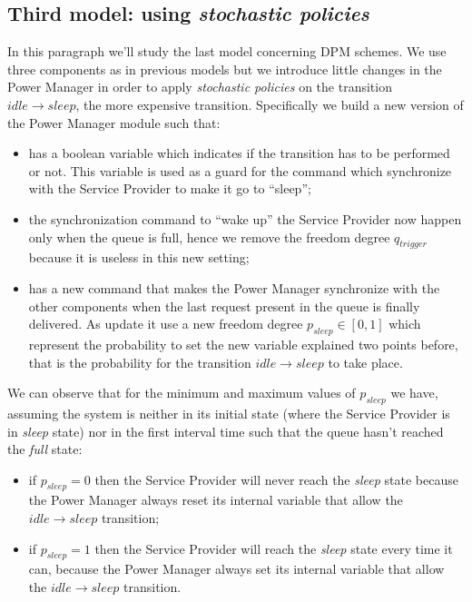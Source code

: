 \subsection{Third model: using \emph{stochastic policies}}

In this paragraph we'll study the last model concerning DPM
schemes. We use three components as in previous models but we
introduce little changes in the Power Manager in order to apply
\emph{stochastic policies} on the transition $idle \rightarrow sleep$,
the more expensive transition. Specifically we build a new version of
the Power Manager module such that:
\begin{itemize}
\item has a boolean variable which indicates if the transition has to
  be performed or not. This variable is used as a guard for the
  command which synchronize with the Service Provider to make it go to
  ``sleep'';
\item the synchronization command to ``wake up'' the Service Provider
  now happen only when the queue is full, hence we remove the freedom
  degree $q_{trigger}$ because it is useless in this new setting;
\item has a new command that makes the Power Manager synchronize with
  the other components when the last request present in the queue is
  finally delivered. As update it use a new freedom degree $p_{sleep}
  \in [0,1]$ which represent the probability to set the new variable
  explained two points before, that is the probability for the
  transition $idle \rightarrow sleep$ to take place.
\end{itemize}

We can observe that for the minimum and maximum values of $p_{sleep}$
we have, assuming the system is neither in its initial state (where
the Service Provider is in \emph{sleep} state) nor in the first
interval time such that the queue hasn't reached the \emph{full}
state:
\begin{itemize}
\item if $p_{sleep} = 0$ then the Service Provider will never reach
  the \emph{sleep} state because the Power Manager always reset its
  internal variable that allow the $idle \rightarrow sleep$ transition;
\item if $p_{sleep} = 1$ then the Service Provider will reach the
  \emph{sleep} state every time it can, because the Power Manager
  always set its internal variable that allow the $idle \rightarrow
  sleep$ transition.
\end{itemize}

